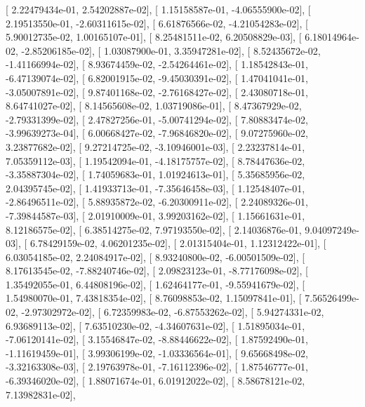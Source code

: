 \documentclass{article}
\begin{document}
       [  2.22479434e-01,   2.54202887e-02],
       [  1.15158587e-01,  -4.06555900e-02],
       [  2.19513550e-01,  -2.60311615e-02],
       [  6.61876566e-02,  -4.21054283e-02],
       [  5.90012735e-02,   1.00165107e-01],
       [  8.25481511e-02,   6.20508829e-03],
       [  6.18014964e-02,  -2.85206185e-02],
       [  1.03087900e-01,   3.35947281e-02],
       [  8.52435672e-02,  -1.41166994e-02],
       [  8.93674459e-02,  -2.54264461e-02],
       [  1.18542843e-01,  -6.47139074e-02],
       [  6.82001915e-02,  -9.45030391e-02],
       [  1.47041041e-01,  -3.05007891e-02],
       [  9.87401168e-02,  -2.76168427e-02],
       [  2.43080718e-01,   8.64741027e-02],
       [  8.14565608e-02,   1.03719086e-01],
       [  8.47367929e-02,  -2.79331399e-02],
       [  2.47827256e-01,  -5.00741294e-02],
       [  7.80883474e-02,  -3.99639273e-04],
       [  6.00668427e-02,  -7.96846820e-02],
       [  9.07275960e-02,   3.23877682e-02],
       [  9.27214725e-02,  -3.10946001e-03],
       [  2.23237814e-01,   7.05359112e-03],
       [  1.19542094e-01,  -4.18175757e-02],
       [  8.78447636e-02,  -3.35887304e-02],
       [  1.74059683e-01,   1.01924613e-01],
       [  5.35685956e-02,   2.04395745e-02],
       [  1.41933713e-01,  -7.35646458e-03],
       [  1.12548407e-01,  -2.86496511e-02],
       [  5.88935872e-02,  -6.20300911e-02],
       [  2.24089326e-01,  -7.39844587e-03],
       [  2.01910009e-01,   3.99203162e-02],
       [  1.15661631e-01,   8.12186575e-02],
       [  6.38514275e-02,   7.97193550e-02],
       [  2.14036876e-01,   9.04097249e-03],
       [  6.78429159e-02,   4.06201235e-02],
       [  2.01315404e-01,   1.12312422e-01],
       [  6.03054185e-02,   2.24084917e-02],
       [  8.93240800e-02,  -6.00501509e-02],
       [  8.17613545e-02,  -7.88240746e-02],
       [  2.09823123e-01,  -8.77176098e-02],
       [  1.35492055e-01,   6.44808196e-02],
       [  1.62464177e-01,  -9.55941679e-02],
       [  1.54980070e-01,   7.43818354e-02],
       [  8.76098853e-02,   1.15097841e-01],
       [  7.56526499e-02,  -2.97302972e-02],
       [  6.72359983e-02,  -6.87553262e-02],
       [  5.94274331e-02,   6.93689113e-02],
       [  7.63510230e-02,  -4.34607631e-02],
       [  1.51895034e-01,  -7.06120141e-02],
       [  3.15546847e-02,  -8.88446622e-02],
       [  1.87592490e-01,  -1.11619459e-01],
       [  3.99306199e-02,  -1.03336564e-01],
       [  9.65668498e-02,  -3.32163308e-03],
       [  2.19763978e-01,  -7.16112396e-02],
       [  1.87546777e-01,  -6.39346020e-02],
       [  1.88071674e-01,   6.01912022e-02],
       [  8.58678121e-02,   7.13982831e-02],
\end{document}
